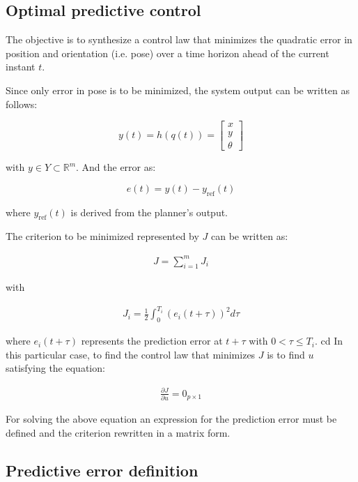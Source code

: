 \documentclass[letterpaper, 10 pt, conference]{ieeeconf}  %
\begin{document}

\subsection{Optimal predictive control}

The objective is to synthesize a control law that minimizes the quadratic error in position and orientation (i.e. pose) over a time horizon ahead of the current instant $t$.

Since only error in pose is to be minimized, the system output can be written as follows:

\[
y(t) = h(q(t)) = \left[\begin{array}{c}
x\\
y\\
\theta
\end{array}
\right]
\]

with ${y \in Y \subset \mathds{R}^m}$. And the error as:

\[
	e(t) =  y(t) - y_{\text{ref}}(t)
\]

where ${y_{\text{ref}}(t)}$ is derived from the planner's output.

The criterion to be minimized represented by $J$ can be written as:

\begin{align*}
J = \sum_{i=1}^m J_i 
\end{align*}

with

\begin{align*}
J_i = \frac{1}{2}\int_0^{T_i} (e_i(t+\tau))^2d\tau
\end{align*}

where ${e_i(t+\tau)}$ represents the prediction error at ${t+\tau}$ with ${0 < \tau \leq T_i}$.
cd 
In this particular case, to find the control law that minimizes $J$ is to find $u$ satisfying the equation:

\begin{align*}
\frac{\partial J}{\partial u} = 0_{p\times 1}
\end{align*}

For solving the above equation an expression for the prediction error must be defined and the criterion rewritten in a matrix form.


\subsection{Predictive error definition}
\end{document}
